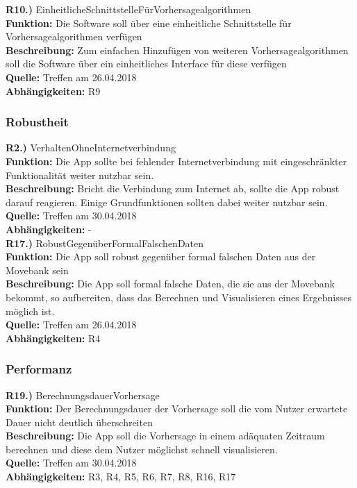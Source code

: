 \documentclass[12pt]{article} %
\begin{document}
\textbf{R10.)} EinheitlicheSchnittstelleFürVorhersagealgorithmen\\
\textbf{Funktion:} Die Software soll über eine einheitliche Schnittstelle für Vorhersagealgorithmen verfügen\\
\textbf{Beschreibung:} Zum einfachen Hinzufügen von weiteren Vorhersagealgorithmen soll die Software über ein einheitliches Interface für diese verfügen\\
\textbf{Quelle:} Treffen am 26.04.2018\\
\textbf{Abhängigkeiten:} R9\\

\subsubsection{Robustheit}

\textbf{R2.)} VerhaltenOhneInternetverbindung \\
\textbf{Funktion:} Die App sollte bei fehlender Internetverbindung mit eingeschränkter Funktionalität weiter nutzbar sein. \\
\textbf{Beschreibung:} Bricht die Verbindung zum Internet ab, sollte die App robust darauf reagieren. Einige Grundfunktionen sollten dabei weiter nutzbar sein. \\
\textbf{Quelle:} Treffen am 30.04.2018 \\
\textbf{Abhängigkeiten:} - \\

\textbf{R17.)} RobustGegenüberFormalFalschenDaten \\
\textbf{Funktion:} Die App soll robust gegenüber formal falschen Daten aus der Movebank sein \\
\textbf{Beschreibung:} Die App soll formal falsche Daten, die sie aus der Movebank bekommt, so aufbereiten, dass das Berechnen und Visualisieren eines Ergebnisses möglich ist. \\
\textbf{Quelle:} Treffen am 26.04.2018 \\
\textbf{Abhängigkeiten:} R4 \\

\subsubsection{Performanz}

\textbf{R19.)} BerechnungsdauerVorhersage \\
\textbf{Funktion:} Der Berechnungsdauer der Vorhersage soll die vom Nutzer erwartete Dauer nicht deutlich überschreiten \\
\textbf{Beschreibung:} Die App soll die Vorhersage in einem adäquaten Zeitraum berechnen und diese dem Nutzer möglichst schnell visualisieren. \\
\textbf{Quelle:} Treffen am 30.04.2018 \\
\textbf{Abhängigkeiten:} R3, R4, R5, R6, R7, R8, R16, R17 \\
\end{document}
